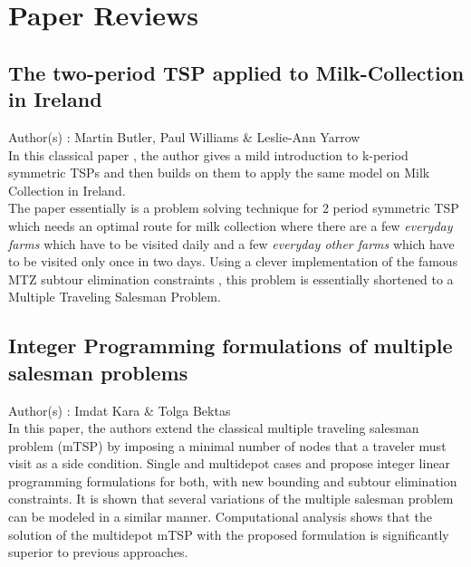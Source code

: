 \documentclass[11pt,fleqn]{book} %
\begin{document}


\chapter{Paper Reviews}

\section{The two-period TSP applied to Milk-Collection in Ireland}
Author(s) : Martin Butler, Paul Williams \& Leslie-Ann Yarrow \\
        
        In this classical paper , the author gives a mild introduction to k-period symmetric TSPs and then builds on them to apply the same model on Milk Collection in Ireland.\\

The paper essentially is a problem solving technique for 2 period symmetric TSP which needs an optimal route for milk collection where there are a few \textit{everyday farms} which have to be visited daily and a few \textit{everyday other farms} which have to be visited only once in two days. Using a clever implementation of the famous MTZ subtour elimination constraints , this problem is essentially shortened to a Multiple Traveling Salesman Problem.  

\section{Integer Programming formulations of multiple salesman problems}
Author(s) : Imdat Kara \& Tolga Bektas \\
        
        In this paper, the authors extend the classical multiple traveling salesman problem (mTSP) by imposing a minimal number of nodes that a traveler must visit as a side condition. Single and multidepot cases and propose integer linear programming formulations for both, with new bounding and subtour elimination constraints. It is shown that several variations of the multiple salesman problem can be modeled in a similar manner. Computational analysis shows that the solution of the multidepot mTSP with the proposed formulation is significantly superior to previous approaches.\\
\end{document}

